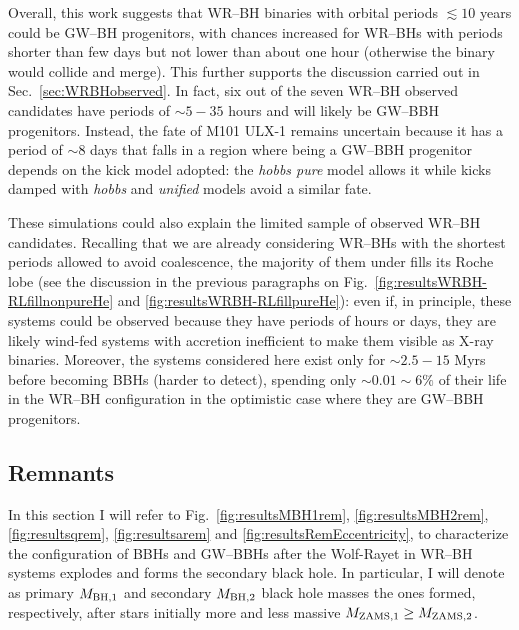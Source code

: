 \documentclass[a4paper,titlepage]{book}     	%
\begin{document}
Overall, this work suggests that WR--BH binaries with orbital periods $\lesssim 10$ years could be GW--BH progenitors, with chances increased for WR--BHs with periods shorter than few days but not lower than about one hour (otherwise the binary would collide and merge). This further supports the discussion carried out in Sec.\ \ref{sec:WRBHobserved}. In fact, six out of the seven WR--BH observed candidates have periods of $\sim 5-35$ hours and will likely be GW--BBH progenitors. Instead, the fate of M101 ULX-1 remains uncertain because it has a period of $\sim 8$ days that falls in a region where being a GW--BBH progenitor depends on the kick model adopted: the \emph{hobbs pure} model allows it while kicks damped with \emph{hobbs} and \emph{unified} models avoid a similar fate.

These simulations could also explain the limited sample of observed WR--BH candidates. Recalling that we are already considering WR--BHs with the shortest periods allowed to avoid coalescence, the majority of them under fills its Roche lobe (see the discussion in the previous paragraphs on Fig.\ \ref{fig:resultsWRBH-RLfillnonpureHe} and \ref{fig:resultsWRBH-RLfillpureHe}): even if, in principle, these systems could be observed because they have periods of hours or days, they are likely wind-fed systems with accretion inefficient to make them visible as X-ray binaries. Moreover, the systems considered here exist only for $\sim 2.5 - 15$ Myrs before becoming BBHs (harder to detect), spending only $\sim 0.01 \sim 6\%$ of their life in the WR--BH configuration in the optimistic case where they are GW--BBH progenitors.








\subsection{Remnants}\label{subsec:remnantsBBHsGWBBHs}
In this section I will refer to Fig.\ \ref{fig:resultsMBH1rem}, \ref{fig:resultsMBH2rem}, \ref{fig:resultsqrem}, \ref{fig:resultsarem} and \ref{fig:resultsRemEccentricity}, to characterize the configuration of BBHs and GW--BBHs after the Wolf-Rayet in WR--BH systems explodes and forms the secondary black hole. In particular, I will denote as primary $M_{\rm BH,1}$ and secondary $M_{\rm BH,2}$ black hole masses the ones formed, respectively, after stars initially more and less massive $M_{\rm ZAMS, 1} \geq M_{\rm ZAMS,2}$.
\end{document}
